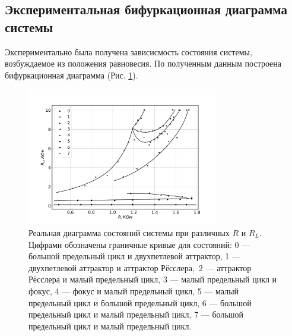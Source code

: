 \documentclass[12pt]{article}
\begin{document}
\subsection*{Экспериментальная бифуркационная диаграмма системы}
Экспериментально была получена зависисмость состояния системы, возбуждаемое из положения равновесия. По 
полученным данным построена бифуркационная диаграмма (Рис. \ref{fig:real_bif_diag}). 
\begin{figure}[H]
	\centering
	\includegraphics[width=0.75\textwidth]{bif_diag_lines.pdf}
	\caption{Реальная диаграмма состояний системы при различных $R$ и $R_L$. 
	Цифрами обозначены граничные кривые для состояний: 
	0 --- большой предельный цикл и двухпетлевой аттрактор,
	1 --- двухпетлевой аттрактор и аттрактор Рёсслера,\
	2 --- аттрактор Рёсслера и малый предельный цикл,
	3 --- малый предельный цикл и фокус, 
	4 --- фокус и малый предельный цикл, 
	5 --- малый предельный цикл и большой предельный цикл,
	6 --- большой предельный цикл и малый предельный цикл,
	7 --- большой предельный цикл и малый предельный цикл.}
	\label{fig:real_bif_diag}
\end{figure}
\end{document}
